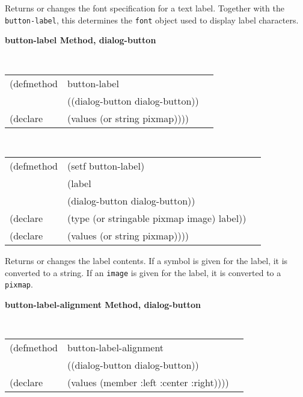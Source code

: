 \begin{flushright} \parbox[t]{6.125in}{
Returns or changes the font specification for a text label. Together
with the {\tt button-label}, this determines the {\tt font}
object used to display label characters.
}
\end{flushright}




{\samepage  
{\large {\bf button-label \hfill Method, dialog-button}}
\begin{flushright} \parbox[t]{6.125in}{
\tt
\begin{tabular}{lll}
\raggedright
(defmethod & button-label & \\
& ((dialog-button  dialog-button)) \\
(declare & (values (or string pixmap))))
\end{tabular}
\rm

}\end{flushright}}

\begin{flushright} \parbox[t]{6.125in}{
\tt
\begin{tabular}{lll}
\raggedright
(defmethod & (setf button-label) & \\
         & (label \\
         & (dialog-button  dialog-button)) \\
(declare &(type (or stringable pixmap image)  label))\\
(declare & (values (or string pixmap))))
\end{tabular}
\rm}
\end{flushright}

\begin{flushright} \parbox[t]{6.125in}{
Returns or changes the label contents. If a symbol is given for the label, it is
converted to a string. If an {\tt image} is given for the label, it is converted
to a {\tt pixmap}.} \end{flushright}

{\samepage  
{\large {\bf button-label-alignment \hfill Method, dialog-button}}
\begin{flushright} \parbox[t]{6.125in}{
\tt
\begin{tabular}{lll}
\raggedright
(defmethod & button-label-alignment & \\
& ((dialog-button  dialog-button)) \\
(declare & (values (member :left :center :right))))
\end{tabular}
\rm

}\end{flushright}}

